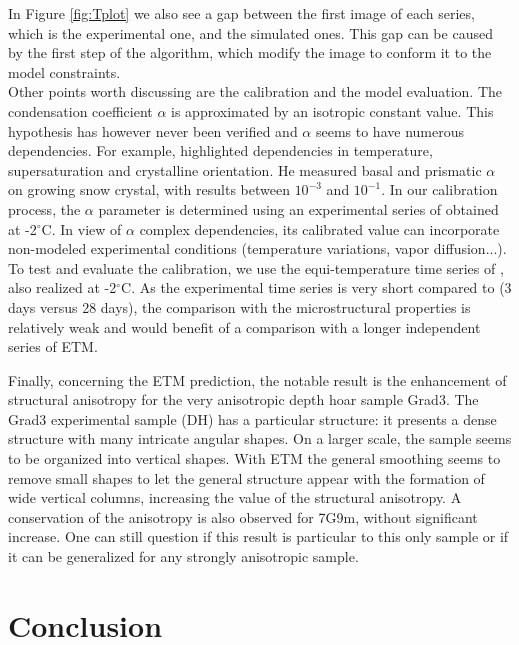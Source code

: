 \documentclass[draft,ms]{agujournal2019}
\begin{document}
In Figure \ref{fig:Tplot} we also see a gap between the first image of each series, which is the experimental one, and the simulated ones. This gap can be caused by the first step of the algorithm, which modify the image to conform it to the model constraints.\\
Other points worth discussing are the calibration and the model evaluation. The condensation coefficient $\alpha$ is approximated by an isotropic constant value. This hypothesis has however never been verified and $\alpha$ seems to have numerous dependencies. For example,  highlighted dependencies in temperature, supersaturation and crystalline orientation. He measured basal and prismatic $\alpha$ on growing snow crystal, with results between $10^{-3}$ and $10^{-1}$.
In our calibration process, the $\alpha$ parameter is determined using an experimental series of  obtained at -2$^\circ$C. In view of $\alpha$ complex dependencies, its calibrated value can incorporate non-modeled experimental conditions (temperature variations, vapor diffusion...).
To test and evaluate the calibration, we use the equi-temperature time series of , also realized at -2$^\circ$C. As the experimental time series is very short compared to  (3 days versus 28 days), the comparison with the microstructural properties is relatively weak and would benefit of a comparison with a longer independent series of ETM. 

Finally, concerning the ETM prediction, the notable result is the enhancement of structural anisotropy for the very anisotropic depth hoar sample Grad3. The Grad3 experimental sample (DH) has a particular structure: it presents a dense structure with many intricate angular shapes. On a larger scale, the sample seems to be organized into vertical shapes. With ETM the general smoothing seems to remove small shapes to let the general structure appear with the formation of wide vertical columns, increasing the value of the structural anisotropy. A conservation of the anisotropy is also observed for 7G9m, without significant increase. One can still question if this result is particular to this only sample or if it can be generalized for any strongly anisotropic sample. 

\section{Conclusion}
\label{sec:conclusion}
\end{document}
